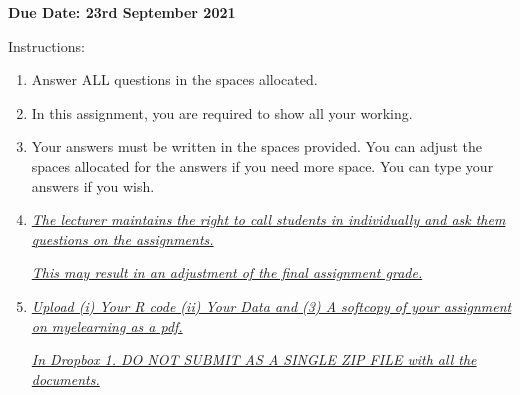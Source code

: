 \documentclass{article}
\begin{document}
    
    \textbf{Due Date: 23rd September 2021}
    
    Instructions:
    
    \begin{enumerate}
        \item Answer ALL questions in the spaces allocated.
        \item In this assignment, you are required to show all your working. 
        \item Your answers must be written in the spaces provided. You can adjust the spaces allocated for the answers if you need more space. You can type your answers if you wish. 
        \item \emph{\underline{The lecturer maintains the right to call students in individually and ask them questions on the assignments.}} 
        
        \emph{\underline{This may result in an adjustment of the final assignment grade.}}
        
        \item \emph{\underline{Upload  (i) Your R code (ii) Your Data and (3) A softcopy of your assignment on myelearning as a pdf. }} 

        \emph{\underline{In Dropbox 1. DO NOT SUBMIT AS A SINGLE ZIP FILE with all the documents.}}
    \end{enumerate}
    
    \vspace{2cm}
    
\end{document}
